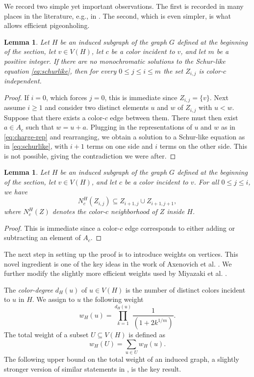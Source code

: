 \documentclass[10pt,a4paper]{amsart}
\newtheorem{lemma}[theorem]{Lemma}
\begin{document}
We record two simple yet important observations. The first is recorded in many places in the literature, e.g., in \cite{Kosciuszko2025}. The second, which is even simpler, is what allows efficient pigeonholing.

\begin{lemma}\label{lem:independence}
Let \(H\) be an induced subgraph of the graph $G$ defined at the beginning of the section, let \(v \in V(H)\), let \(c\) be a color incident to \(v\), and let $m$ be a positive integer. If there are no monochromatic solutions to the Schur-like equation \eqref{eq:schurlike}, then for every \(0 \leq j \leq i\leq m\) the set \(Z_{i,j}\) is color-\(c\) independent.
\end{lemma}

\begin{proof} If $i=0$, which forces $j=0$, this is immediate since $Z_{i,j}=\{v\}$. Next assume $i \geq 1$ and consider two distinct elements \(u\) and \(w\) of \(Z_{i,j}\) with \(u<w\). Suppose that there exists a color-\(c\) edge between them. There must then exist $a \in A_c$ such that $w = u + a$. Plugging in the representations of \(u\) and \(w\) as in \eqref{eq:charge-rep} and rearranging, we obtain a solution to a Schur-like equation as in \eqref{eq:schurlike}, with \(i+1\) terms on one side and \(i\) terms on the other side. This is not possible, giving the contradiction we were after.
\end{proof}

\begin{lemma}\label{lem:branching}
Let \(H\) be an induced subgraph of the graph $G$ defined at the beginning of the section, let \(v \in V(H)\), and let \(c\) be a color incident to \(v\). For all \(0\leq j \leq i\), we have 
\[
 N_{c}^{H}(Z_{i,j}) \subseteq Z_{i+1,j} \cup Z_{i+1,j+1},
 \] 
 where
\(N_{c}^{H}(Z)\) denotes the color-\(c\) neighborhood of \(Z\) inside \(H\).
\end{lemma}

\begin{proof} 
This is immediate since a color-\(c\) edge corresponds to either adding or subtracting an element of \(A_{c}\).
\end{proof}

The next step in setting up the proof is to introduce weights on vertices. This novel ingredient is one of the key ideas in the work of Axenovich et al. \cite{ACJMR2026}. We further modify the slightly more efficient weights used by Miyazaki et al. \cite{MMPZ2026}.

The \emph{color-degree} \(d_{H}(u)\) of \(u \in V(H)\) is the number of distinct colors incident to $u$ in \(H\). We assign to \(u\) the following weight
\begin{equation} \label{eq:weights}
 w_H(u) = \prod_{k=1}^{d_H(u)} \frac{1}{(1+ 2 k^{1/m})}.
\end{equation}
 The total weight of
a subset \(U\subseteq V(H)\) is defined as
\[
 w_{H}(U)=\sum_{u\in U}w_{H}(u). 
 \]
The following upper bound on the total weight of an induced graph, a slightly stronger version of similar statements in \cite{ACJMR2026,MMPZ2026}, is the key result.
\end{document}
